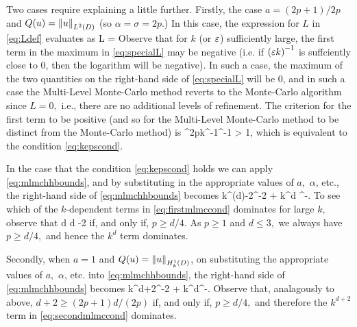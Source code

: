 Two cases require explaining a little further. Firstly, the case $a=(2p+1)/2p$ and $Q(u) = \NLtD{u}$ (so $\alpha = \sigma = 2p.$) In this case, the expression for $L$ in \cref{eq:Ldef} evaluates as
  \beq\label{eq:specialL}
  L = \max{}
\eeq
Observe that for $k$ (or $\varepsilon$) sufficiently large, the first term in the maximum in \cref{eq:specialL} may be negative (i.e. if $\mleft(\eps k\mright)^{-1}$ is suffciently close to 0, then the logarithm will be negative). In such a case, the maximum of the two quantities on the right-hand side of \cref{eq:specialL} will be 0, and in such a case the Multi-Level Monte-Carlo method reverts to the Monte-Carlo algorithm since $L=0,$ i.e., there are no additional levels of refinement. The criterion for the first term to be positive (and so for the Multi-Level Monte-Carlo method to be distinct from the Monte-Carlo method) is
\beqs
{}\co\Ccoarse^{2p}k^{-1}\eps^{-1} > 1,
\eeqs
which is equivalent to the condition \cref{eq:kepscond}.

In the case that the condition \cref{eq:kepscond} holds we can apply \cref{eq:mlmchhbounds}, and by substituting in the appropriate values of $a,$ $\alpha$, etc., the right-hand side of \cref{eq:mlmchhbounds} becomes
\beq\label{eq:firstmlmccond}
k^{\mleft(d\mright)-2}\eps^{-2} + k^d \eps^{-}.
\eeq
To see which of the $k$-dependent terms in \cref{eq:firstmlmccond} dominates for large $k,$ observe that
\beqs
d \geq {}d -2
\eeqs
if, and only if, $p \geq d/4.$ As $p \geq 1$ and $d \leq 3,$ we always have $p \geq d/4,$ and hence the $k^d$ term dominates.

Secondly, when $a=1$ and $Q(u) = \NHokD{u}$, on substituting the appropriate values of $a,$ $\alpha$, etc. into \cref{eq:mlmchhbounds}, the right-hand side of \cref{eq:mlmchhbounds} becomes
\beq\label{eq:secondmlmccond}
k^{d+2}\eps^{-2} + k^{d}\eps^{-}.
\eeq
Observe that, analagously to above, $d + 2 \geq (2p+1)d/(2p)$ if, and only if, $p \geq d/4,$ and therefore the $k^{d+2}$ term in \cref{eq:secondmlmccond} dominates.
\epf


